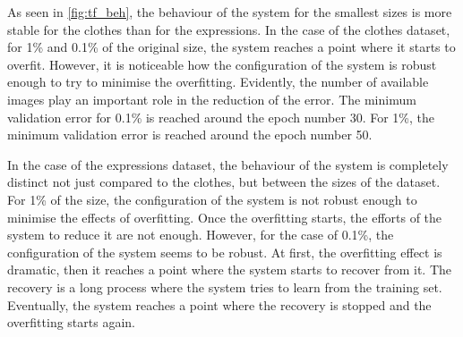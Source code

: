 \documentclass{article}
\begin{document}
As seen in \ref{fig:tf_beh}, the behaviour of the system for the smallest sizes is more stable for the clothes than for the expressions. In the case of the clothes dataset, for 1\% and 0.1\% of the original size, the system reaches a point where it starts to overfit. However, it is noticeable how the configuration of the system is robust enough to try to minimise the overfitting. Evidently, the number of available images play an important role in the reduction of the error. The minimum validation error for 0.1\% is reached around the epoch number 30. For 1\%, the minimum validation error is reached around the epoch number 50.

In the case of the expressions dataset, the behaviour of the system is completely distinct not just compared to the clothes, but between the sizes of the dataset. For 1\% of the size, the configuration of the system is not robust enough to minimise the effects of overfitting. Once the overfitting starts, the efforts of the system to reduce it are not enough. However, for the case of 0.1\%, the configuration of the system seems to be robust.  At first, the overfitting effect is dramatic, then it reaches a point where the system starts to recover from it. The recovery is a long process where the system tries to learn from the training set. Eventually, the system reaches a point where the recovery is stopped and the overfitting starts again.
\end{document}

